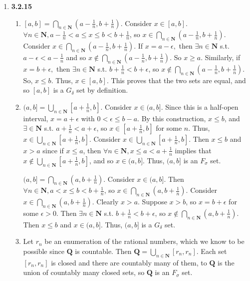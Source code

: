 \documentclass{article}
\begin{document}
\begin{enumerate}
     \item \textbf{3.2.15}
     \begin{enumerate}
         \item $[a, b] = \bigcap_{n\in\mathbf{N}} (a - \frac{1}{n}, b + \frac{1}{n})$. Consider $x \in [a, b].$ $\forall n \in \mathbf{N}, a - \frac{1}{n} < a \leq x \leq b < b + \frac{1}{n}$, so $x \in \bigcap_{n\in\mathbf{N}} (a - \frac{1}{n}, b + \frac{1}{n})$. Consider $x \in \bigcap_{n\in\mathbf{N}} (a - \frac{1}{n}, b + \frac{1}{n})$. If $x = a - \epsilon,$ then $\exists n \in \mathbf{N}$ s.t. $a - \epsilon < a - \frac{1}{n}$ and so $x \notin \bigcap_{n\in\mathbf{N}} (a - \frac{1}{n}, b + \frac{1}{n})$. So $x \geq a$. Similarly, if $x = b + \epsilon,$ then $\exists n \in \mathbf{N}$ s.t. $b + \frac{1}{n} < b + \epsilon$, so $x \notin \bigcap_{n\in\mathbf{N}} (a - \frac{1}{n}, b + \frac{1}{n})$. So, $x \leq b$. Thus, $x \in [a, b]$. This proves that the two sets are equal, and so $[a, b]$ is a $G_\delta$ set by definition. 

         \item $(a, b] = \bigcup_{n\in \mathbf{N}} [a + \frac{1}{n}, b]$. Consider $x \in (a, b]$. Since this is a half-open interval, $x = a + \epsilon$ with $0 < \epsilon \leq b - a$. By this construction, $x \leq b$, and $\exists  \in \mathbf{N}$ s.t. $a + \frac{1}{n} < a + \epsilon$, so $x \in [a + \frac{1}{n}, b]$ for some $n$. Thus, $x \in \bigcup_{n\in \mathbf{N}} [a + \frac{1}{n}, b]$. Consider $x \in \bigcup_{n\in \mathbf{N}} [a + \frac{1}{n}, b]$. Then $x \leq b$ and $x > a$ since if $x \leq a$, then $\forall n \in \mathbf{N}, x \leq a < a + \frac{1}{n}$ implies that $x \notin \bigcup_{n\in \mathbf{N}} [a + \frac{1}{n}, b]$, and so $x \in (a, b]$. Thus, $(a, b]$ is an $F_\sigma$ set.

         \smallskip

        $(a, b] = \bigcap_{n\in\mathbf{N}} \left(a, b + \frac{1}{n}\right)$. Consider $x \in (a, b]$. Then $\forall n \in \mathbf{N}, a < x \leq b < b + \frac{1}{n}$, so $x \in \bigcap_{n\in\mathbf{N}} \left(a, b + \frac{1}{n}\right)$. Consider $x \in \bigcap_{n\in\mathbf{N}} \left(a, b + \frac{1}{n}\right)$. Clearly $x > a$. Suppose $x > b$, so $x = b + \epsilon$ for some $\epsilon > 0$. Then $\exists n \in \mathbf{N}$ s.t. $b + \frac{1}{n} < b + \epsilon$, so $x \notin \bigcap_{n\in\mathbf{N}} \left(a, b + \frac{1}{n}\right)$. Then $x \leq b$ and $x \in (a, b]$. Thus, $(a, b]$ is a $G_\delta$ set. 

        \item Let $r_n$ be an enumeration of the rational numbers, which we know to be possible since $\mathbf{Q}$ is countable. Then $\mathbf{Q} = \bigcup_{n \in \mathbf{N}} [r_n, r_n]$. Each set $[r_n, r_n]$ is closed and there are countably many of them, to $\mathbf{Q}$ is the union of countably many closed sets, so $\mathbf{Q}$ is an $F_\sigma$ set. 


\end{enumerate}
\end{enumerate}
\end{document}
